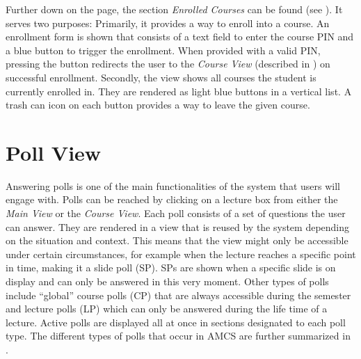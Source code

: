 Further down on the page, the section \emph{Enrolled Courses} can be found (see ). It serves two purposes: Primarily, it provides a way to enroll into a course. An enrollment form is shown that consists of a text field to enter the course PIN and a blue button to trigger the enrollment. When provided with a valid PIN, pressing the button redirects the user to the \emph{Course View} (described in ) on successful enrollment.
Secondly, the view shows all courses the student is currently enrolled in. They are rendered as light blue buttons in a vertical list. A trash can icon on each button provides a way to leave the given course.

\section{Poll View}
\label{section:soa:pollview}
Answering polls is one of the main functionalities of the system that users will engage with.
Polls can be reached by clicking on a lecture box from either the \emph{Main View} or the \emph{Course View}.
Each poll consists of a set of questions the user can answer. They are rendered in a view that is reused by the system depending on the situation and context. This means that the view might only be accessible under certain circumstances, for example when the lecture reaches a specific point in time, making it a slide poll (SP). SPs are shown when a specific slide is on display and can only be answered in this very moment. Other types of polls include “global” course polls (CP) that are always accessible during the semester and lecture polls (LP) which can only be answered during the life time of a lecture.
Active polls are displayed all at once in sections designated to each poll type.
The different types of polls that occur in AMCS are further summarized in .



